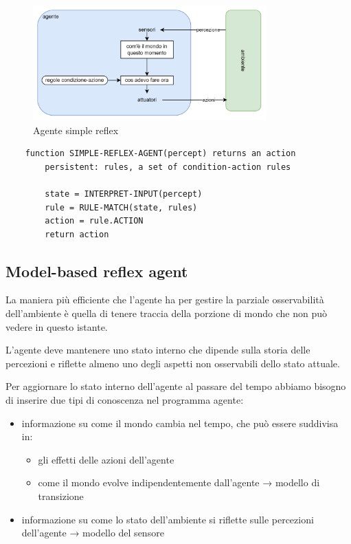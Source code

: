 \begin{figure}[H]
	\centering
	\includegraphics[width=0.8\textwidth]{capitoli/agenti-intelligenti/imgs/simple-reflex.png}
	\caption{Agente simple reflex}
	\label{fig:immagine2}
\end{figure}

\begin{lstlisting}
	function SIMPLE-REFLEX-AGENT(percept) returns an action
		persistent: rules, a set of condition-action rules
		
		state = INTERPRET-INPUT(percept)
		rule = RULE-MATCH(state, rules)
		action = rule.ACTION
		return action
\end{lstlisting}

\subsection{Model-based reflex agent}

La maniera più efficiente che l’agente ha per gestire la parziale osservabilità dell’ambiente è quella di tenere traccia della porzione di mondo che non può vedere in questo istante.

L’agente deve mantenere uno stato interno che dipende sulla storia delle percezioni e riflette almeno uno degli aspetti non osservabili dello stato attuale.

Per aggiornare lo stato interno dell’agente al passare del tempo abbiamo bisogno di inserire due tipi di conoscenza nel programma agente:

\begin{itemize}
	\item informazione su come il mondo cambia nel tempo, che può essere suddivisa in:
	\begin{itemize}
		\item gli effetti delle azioni dell’agente 
		\item come il mondo evolve indipendentemente dall’agente → modello di transizione
	\end{itemize}
	\item informazione su come lo stato dell’ambiente si riflette sulle percezioni dell’agente → modello del sensore
\end{itemize}

